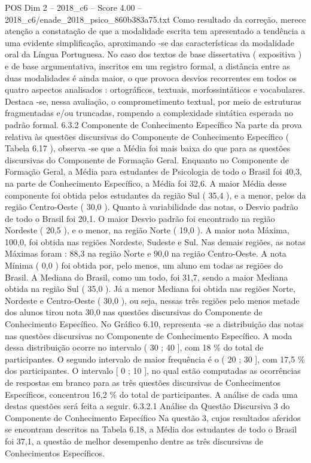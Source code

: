 \begin{textsample}{POS Dim 2 – 2018\_c6 – Score 4.00 – 2018\_c6/enade\_2018\_psico\_860b383a75.txt}
Como resultado da correção, merece atenção a constatação de que a modalidade escrita tem apresentado a tendência a uma evidente simplificação, aproximando -se das características da modalidade oral da Língua Portuguesa.
No caso dos textos de base dissertativa ( expositiva ) e de base argumentativa, inscritos em um registro formal, a distância entre as duas modalidades é ainda maior, o que provoca desvios recorrentes em todos os quatro aspectos analisados : ortográficos, textuais, morfossintáticos e vocabulares.
Destaca -se, nessa avaliação, o comprometimento textual, por meio de estruturas fragmentadas e/ou truncadas, rompendo a complexidade sintática esperada no padrão formal. 6.3.2 Componente de Conhecimento Específico Na parte da prova relativa às questões discursivas do Componente de Conhecimento Específico ( Tabela 6.17 ), observa -se que a Média foi mais baixa do que para as questões discursivas do Componente de Formação Geral.
Enquanto no Componente de Formação Geral, a Média para estudantes de Psicologia de todo o Brasil foi 40,3, na parte de Conhecimento Específico, a Média foi 32,6.
A maior Média desse componente foi obtida pelos estudantes da região Sul ( 35,4 ), e a menor, pelos da região Centro-Oeste ( 30,0 ).
Quanto à variabilidade das notas, o Desvio padrão de todo o Brasil foi 20,1.
O maior Desvio padrão foi encontrado na região Nordeste ( 20,5 ), e o menor, na região Norte ( 19,0 ).
A maior nota Máxima, 100,0, foi obtida nas regiões Nordeste, Sudeste e Sul.
Nas demais regiões, as notas Máximas foram : 88,3 na região Norte e 90,0 na região Centro-Oeste.
A nota Mínima ( 0,0 ) foi obtida por, pelo menos, um aluno em todas as regiões do Brasil.
A Mediana do Brasil, como um todo, foi 31,7, sendo a maior Mediana obtida na região Sul ( 35,0 ).
Já a menor Mediana foi obtida nas regiões Norte, Nordeste e Centro-Oeste ( 30,0 ), ou seja, nessas três regiões pelo menos metade dos alunos tirou nota 30,0 nas questões discursivas do Componente de Conhecimento Específico.
No Gráfico 6.10, representa -se a distribuição das notas nas questões discursivas no Componente de Conhecimento Específico.
A moda dessa distribuição ocorre no intervalo ( 30 ; 40 ], com 18 \% do total de participantes.
O segundo intervalo de maior frequência é o ( 20 ; 30 ], com 17,5 \% dos participantes.
O intervalo [ 0 ; 10 ], no qual estão computadas as ocorrências de respostas em branco para as três questões discursivas de Conhecimentos Específicos, concentrou 16,2 \% do total de participantes.
A análise de cada uma destas questões será feita a seguir. 6.3.2.1 Análise da Questão Discursiva 3 do Componente de Conhecimento Específico Na questão 3, cujos resultados aferidos se encontram descritos na Tabela 6.18, a Média dos estudantes de todo o Brasil foi 37,1, a questão de melhor desempenho dentre as três discursivas de Conhecimentos Específicos.

\end{textsample}
